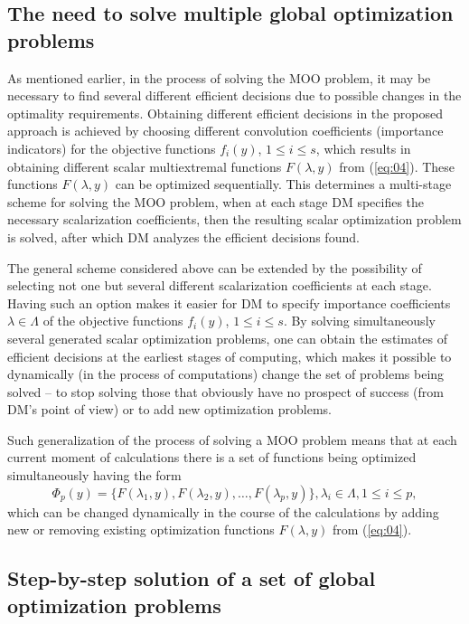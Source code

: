 \documentclass[runningheads]{llncs}
\begin{document}
\subsection{The need to solve multiple global optimization problems} 
\label{subsec:41}

As mentioned earlier, in the process of solving the MOO problem, it may be necessary to find several different efficient decisions due to possible changes in the optimality requirements. Obtaining different efficient decisions in the proposed approach is achieved by choosing different convolution coefficients (importance indicators) for the objective functions $f_i(y)$, $1 \leq i \leq s$, which results in obtaining different  scalar multiextremal functions $F(\lambda, y)$ from (\ref{eq:04}). These functions $F(\lambda, y)$ can be optimized sequentially. This determines a multi-stage scheme for solving the MOO problem, when at each stage DM specifies the necessary scalarization coefficients, then the resulting scalar optimization problem is solved, after which DM analyzes the efficient decisions found. 

The general scheme considered above can be extended by the possibility of selecting not one but several different scalarization coefficients at each stage. Having such an option makes it easier for DM  to specify importance coefficients $\lambda \in \Lambda$ of the objective functions $f_i(y)$, $1 \leq i \leq s$. By solving simultaneously several generated scalar optimization problems, one can  obtain the estimates of efficient decisions at the earliest stages of computing, which makes it possible to dynamically (in the process of computations) change the set of problems being solved -- to stop solving those that obviously have no prospect of success (from DM's point of view) or to add new optimization problems. 

Such generalization of the process of solving a MOO problem means that at each current moment of calculations there is a set of functions being optimized simultaneously having the form
\begin{equation}
\label{eq:21}
\Phi_p (y)=\{ F(\lambda_1,y), F(\lambda_2,y),\dots,F(\lambda_p,y)  \},  \lambda_i \in \Lambda, 1 \leq i \leq p,
\end{equation}
which can be changed dynamically in the course of the calculations by adding new or removing existing optimization functions $F(\lambda, y)$ from (\ref{eq:04}). 


\subsection{Step-by-step solution of a set of global optimization problems} 
\label{subsec:42}
\end{document}
